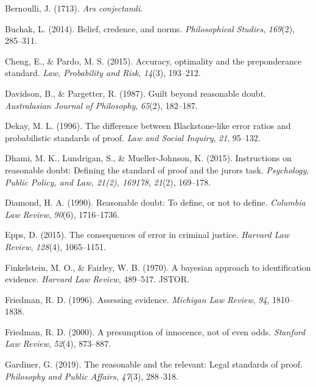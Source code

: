 \documentclass[10pt,dvipsnames]{scrartcl}
\begin{document}
\leavevmode\hypertarget{ref-Bernoulli1713Ars-conjectandi}{}%
Bernoulli, J. (1713). \emph{Ars conjectandi}.

\leavevmode\hypertarget{ref-buchak2014belief}{}%
Buchak, L. (2014). Belief, credence, and norms. \emph{Philosophical
Studies}, \emph{169}(2), 285--311.

\leavevmode\hypertarget{ref-cheng2015}{}%
Cheng, E., \& Pardo, M. S. (2015). Accuracy, optimality and the
preponderance standard. \emph{Law, Probability and Risk}, \emph{14}(3),
193--212.

\leavevmode\hypertarget{ref-davidsonpargetter1987}{}%
Davidson, B., \& Pargetter, R. (1987). Guilt beyond reasonable doubt.
\emph{Australasian Journal of Philosophy}, \emph{65}(2), 182--187.

\leavevmode\hypertarget{ref-Dekay1996}{}%
Dekay, M. L. (1996). The difference between Blackstone-like error ratios
and probabilistic standards of proof. \emph{Law and Social Inquiry},
\emph{21}, 95--132.

\leavevmode\hypertarget{ref-dhamiEtAl2015}{}%
Dhami, M. K., Lundrigan, S., \& Mueller-Johnson, K. (2015). Instructions
on reasonable doubt: Defining the standard of proof and the jurors task.
\emph{Psychology, Public Policy, and Law, 21(2), 169178}, \emph{21}(2),
169--178.

\leavevmode\hypertarget{ref-diamond90}{}%
Diamond, H. A. (1990). Reasonable doubt: To define, or not to define.
\emph{Columbia Law Review}, \emph{90}(6), 1716--1736.

\leavevmode\hypertarget{ref-epps2015}{}%
Epps, D. (2015). The consequences of error in criminal justice.
\emph{Harvard Law Review}, \emph{128}(4), 1065--1151.

\leavevmode\hypertarget{ref-finkelstein1970bayesian}{}%
Finkelstein, M. O., \& Fairley, W. B. (1970). A bayesian approach to
identification evidence. \emph{Harvard Law Review}, 489--517. JSTOR.

\leavevmode\hypertarget{ref-friedman1996}{}%
Friedman, R. D. (1996). Assessing evidence. \emph{Michigan Law Review},
\emph{94}, 1810--1838.

\leavevmode\hypertarget{ref-Friedman2000presumption}{}%
Friedman, R. D. (2000). A presumption of innocence, not of even odds.
\emph{Stanford Law Review}, \emph{52}(4), 873--887.

\leavevmode\hypertarget{ref-gardiner2019ppa}{}%
Gardiner, G. (2019). The reasonable and the relevant: Legal standards of
proof. \emph{Philosophy and Public Affairs}, \emph{47}(3), 288--318.
\end{document}
